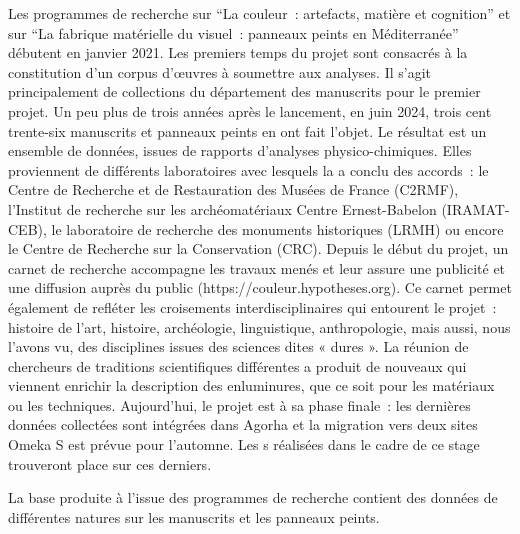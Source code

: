 Les programmes de recherche sur \enquote{La couleur : artefacts, matière et cognition} et sur \enquote{La fabrique matérielle du visuel~: panneaux peints en Méditerranée} débutent en janvier 2021. Les premiers temps du projet sont consacrés à la constitution d’un corpus d’œuvres à soumettre aux analyses. Il s’agit principalement de collections du département des manuscrits pour le premier projet. Un peu plus de trois années après le lancement, en juin 2024, trois cent trente-six manuscrits et panneaux peints en ont fait l’objet. Le résultat est un ensemble de données, issues de rapports d’analyses physico-chimiques. Elles proviennent de différents laboratoires avec lesquels la  a conclu des accords~: le Centre de Recherche et de Restauration des Musées de France (C2RMF), l’Institut de recherche sur les archéomatériaux Centre Ernest-Babelon (IRAMAT-CEB), le laboratoire de recherche des monuments historiques (LRMH) ou encore le Centre de Recherche sur la Conservation (CRC). Depuis le début du projet, un carnet de recherche accompagne les travaux menés et leur assure une publicité et une diffusion auprès du public (https://couleur.hypotheses.org). Ce carnet permet également de refléter les croisements interdisciplinaires qui entourent le projet~: histoire de l’art, histoire, archéologie, linguistique, anthropologie, mais aussi, nous l’avons vu, des disciplines issues des sciences dites « dures ». La réunion de chercheurs de traditions scientifiques différentes a produit de nouveaux  qui viennent enrichir la description des enluminures, que ce soit pour les matériaux ou les techniques. Aujourd’hui, le projet est à sa phase finale~: les dernières données collectées sont intégrées dans Agorha et la migration vers deux sites Omeka S est prévue pour l’automne. Les s réalisées dans le cadre de ce stage trouveront place sur ces derniers. \newline\par
La base produite à l’issue des programmes de recherche contient des données de différentes natures sur les manuscrits et les panneaux peints.

